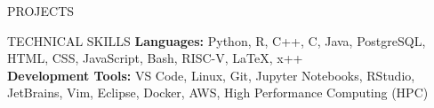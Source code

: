 \documentclass{resume} %
\begin{document}
\begin{rSection}{PROJECTS}

 
 
\end{rSection} 
\vspace{-6pt}
\begin{rSection}{TECHNICAL SKILLS}
\textbf{Languages:} Python, R, C++, C, Java, PostgreSQL, HTML, CSS, JavaScript, Bash, RISC-V, LaTeX, x++\\
\textbf{Development Tools:} VS Code, Linux, Git, Jupyter Notebooks, RStudio, JetBrains, Vim, Eclipse, Docker, AWS, High Performance Computing (HPC)
\end{rSection}
\end{document}
